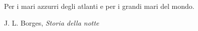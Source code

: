 \documentclass[%
  libro,          
  corpo=12pt,        %
  tipotesi=custom %
]{toptesi}
\begin{document}
\renewcommand{\epsilon}{\varepsilon}
\renewcommand{\phi}{\varphi}

  
  \newpage
  \tableofcontents
  \newpage
  \hspace{0pt}
  \vfill
  \epigraph{Per i mari azzurri degli atlanti e per i grandi mari del mondo.}{J. L. Borges, \textit{Storia della notte}}
  \vfill
  \hspace{0pt}
  \newpage
  \
  \newpage
  

  
  
  
  

  \nocite{*}
  \printbibliography[heading=bibintoc,
  title={Riferimenti bibliografici}]

  
\end{document}
